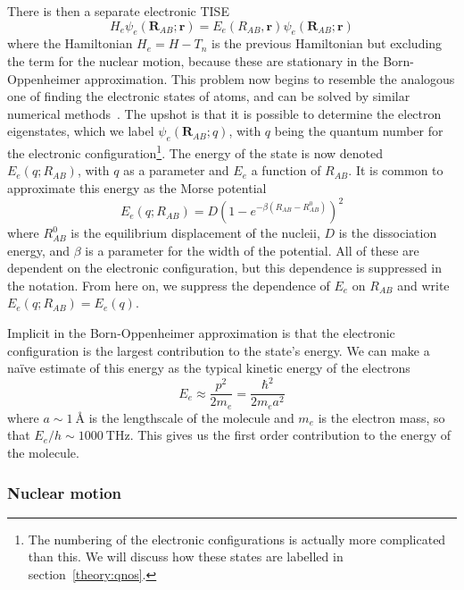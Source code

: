 There is then a separate electronic TISE
%
\begin{equation}
  H_e \psi_e(\mathbf{R}_{AB}; \mathbf{r}) = E_e(R_{AB}, \mathbf{r})\psi_e(\mathbf{R}_{AB};
  \mathbf{r})
  \label{theory:eqn:TISEelectron}
\end{equation}
%
where the Hamiltonian $H_e = H - T_n$ is the previous Hamiltonian but excluding
the term for the nuclear motion, because these are stationary in the
Born-Oppenheimer approximation. This problem now begins to resemble the
analogous one of finding the electronic states of atoms, and can be solved by
similar numerical methods~\cite{Foot2005, bransden2003}. The upshot is that it
is possible to determine the electron eigenstates, which we label
$\psi_e(\mathbf{R}_{AB}; q)$, with $q$ being the quantum number for the
electronic configuration\footnote{The numbering of the electronic
configurations is actually more complicated than this. We will discuss how
these states are labelled in section~\ref{theory:qnos}.}. The energy of the
state is now denoted $E_e(q; R_{AB})$, with $q$ as a parameter and $E_e$ a
function of  $R_{AB}$.  It is common to approximate this energy as the Morse
potential
%
\begin{equation}
  E_e(q; R_{AB}) = D(1-e^{-\beta(R_{AB} - R_{AB}^0)})^2
\end{equation}
%
where $R_{AB}^0$ is the equilibrium displacement of the nucleii, $D$ is the
dissociation energy, and $\beta$ is a parameter for the width of the
potential. All of these are dependent on the electronic configuration, but this
dependence is suppressed in the notation. From here on, we suppress the
dependence of $E_e$ on $R_{AB}$ and write $E_e(q; R_{AB}) = E_e(q)$.

Implicit in the Born-Oppenheimer approximation is that the electronic
configuration is the largest contribution to the state's energy. We can make a
na\"ive estimate of this energy as the typical kinetic energy of the electrons
%
\begin{equation}
  E_e \approx \frac{p^2}{2m_e} = \frac{\hbar^2}{2m_e a^2}
\end{equation}
%
where $a\sim\SI{1}{\angstrom}$ is the lengthscale of the molecule and $m_e$ is
the electron mass, so that $E_e/h \sim \SI{1000}{\tera\hertz}$. This
gives us the first order contribution to the energy of the molecule. 

\subsubsection{Nuclear motion}

